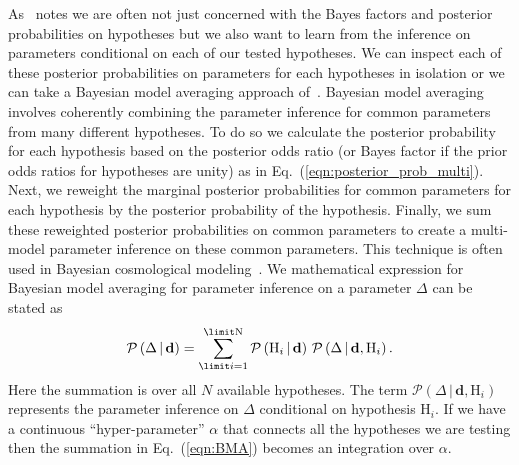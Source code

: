 As~\cite{read2006encyclopedia} notes we are often not just concerned with the Bayes factors and posterior probabilities on hypotheses but we also want to learn from the inference on parameters conditional on each of our tested hypotheses. We can inspect each of these posterior probabilities on parameters for each hypotheses in isolation or we can take a Bayesian model averaging approach of~\cite{kass1995bayes}. Bayesian model averaging involves coherently combining the parameter inference for common parameters from many different hypotheses. To do so we calculate the posterior probability for each hypothesis based on the posterior odds ratio (or Bayes factor if the prior odds ratios for hypotheses are unity) as in Eq.~(\ref{eqn:posterior_prob_multi}). Next, we reweight the marginal posterior probabilities for common parameters for each hypothesis by the posterior probability of the hypothesis. Finally, we sum these reweighted posterior probabilities on common parameters to create a multi-model parameter inference on these common parameters. This technique is often used in Bayesian cosmological modeling~\cite{hobson2010bayesian}. We mathematical expression for Bayesian model averaging for parameter inference on a parameter $\Delta$ can be stated as
\begin{equation}\label{eqn:BMA}
    \mathcal{P} \left( \Delta \, | \, \mathbf{d}\right) = \sum_{\limit i=1}^{\limit \mathrm{N}}  \mathcal{P} \left(\mathrm{H}_i \, | \, \mathbf{d}\right) \,  \mathcal{P} \left(\Delta \, | \, \mathbf{d}, \mathrm{H}_i\right).
\end{equation}
Here the summation is over all $N$ available hypotheses. The term $\mathcal{P} \left(\Delta \, | \, \mathbf{d}, \mathrm{H}_i\right)$ represents the parameter inference on $\Delta$ conditional on hypothesis $\mathrm{H}_i$. If we have a continuous ``hyper-parameter'' $\alpha$ that connects all the hypotheses we are testing then the summation in Eq.~(\ref{eqn:BMA}) becomes an integration over $\alpha$. 

